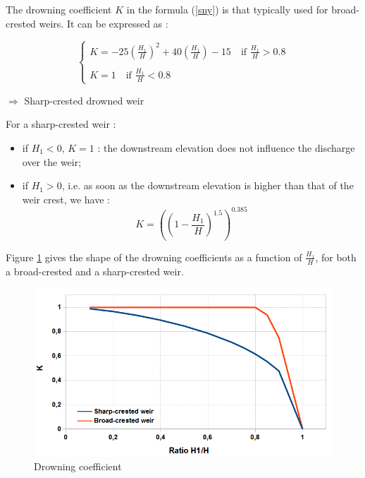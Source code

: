 The drowning coefficient $K$ in the formula (\ref{sny}) is that typically used for broad-crested weirs. It can be expressed as :

\begin{equation}
 \left \lbrace
  \begin{array}{l}
    K = -25 \left ( \frac{H_1}{H} \right )^2 + 40 \left ( \frac{H_1}{H} \right ) - 15 \quad \mbox{if } \frac{H_1}{H} > 0.8\\
    \\
    K = 1 \quad \mbox{if } \frac{H_1}{H} < 0.8
  \end{array}
 \right.
\end{equation}

$\Longrightarrow$ Sharp-crested drowned weir

For a sharp-crested weir :
\begin{itemize}
 \item if $H_1 < 0$, $K=1$ : the downstream elevation does not influence the discharge over the weir;
 \item if $H_1 > 0$, i.e. as soon as the downstream elevation is higher than that of the weir crest, we have :
   \begin{equation}
     K = \left ( \left ( 1 - \frac{H_1}{H} \right )^{1.5} \right )^{0.385}
   \end{equation}
\end{itemize}

Figure \ref{fig:CFEN} gives the shape of the drowning coefficients as a function of $\frac{H_1}{H}$, for both a broad-crested and a sharp-crested weir.

\begin{figure}[H]
    \begin{center}
     \includegraphics[width=\textwidth]{Figures/CoefEn.png}
     \caption{Drowning coefficient}
     \label{fig:CFEN}
    \end{center}
\end{figure}

